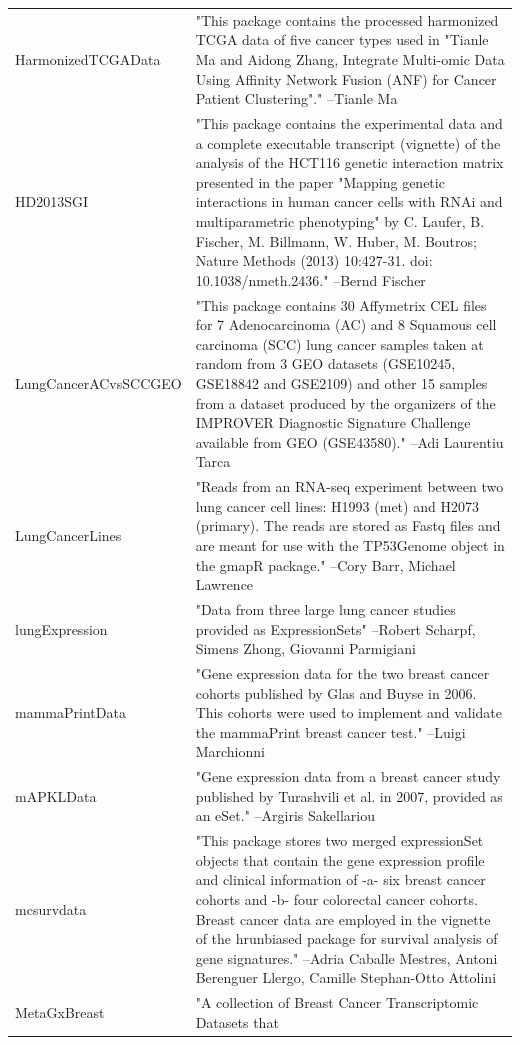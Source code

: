 \documentclass[]{article}
\begin{document}
\begin{longtable}[t]{l>{\raggedright\arraybackslash}p{25em}}
\addlinespace
HarmonizedTCGAData & "This package contains the processed harmonized TCGA data
of five cancer types used in "Tianle Ma and Aidong Zhang,
Integrate Multi-omic Data Using Affinity Network Fusion (ANF)
for Cancer Patient Clustering"." --Tianle Ma\\
HD2013SGI & "This package contains the experimental data and a complete
executable transcript (vignette) of the analysis of the HCT116
genetic interaction matrix presented in the paper "Mapping
genetic interactions in human cancer cells with RNAi and
multiparametric phenotyping" by C. Laufer, B. Fischer, M.
Billmann, W. Huber, M. Boutros; Nature Methods (2013)
10:427-31. doi: 10.1038/nmeth.2436." --Bernd Fischer\\
LungCancerACvsSCCGEO & "This package contains 30 Affymetrix CEL files for 7
Adenocarcinoma (AC) and 8 Squamous cell carcinoma (SCC) lung
cancer samples taken at random from 3 GEO datasets (GSE10245,
GSE18842 and GSE2109) and other 15 samples from a dataset
produced by the organizers of the IMPROVER Diagnostic Signature
Challenge available from GEO (GSE43580)." --Adi Laurentiu Tarca\\
LungCancerLines & "Reads from an RNA-seq experiment between two lung cancer
cell lines: H1993 (met) and H2073 (primary). The reads are
stored as Fastq files and are meant for use with the TP53Genome
object in the gmapR package." --Cory Barr, Michael Lawrence\\
lungExpression & "Data from three large lung cancer studies provided as
ExpressionSets" --Robert Scharpf, Simens Zhong, Giovanni Parmigiani\\
\addlinespace
mammaPrintData & "Gene expression data for the two breast cancer cohorts
published by Glas and Buyse in 2006. This cohorts were used to
implement and validate the mammaPrint breast cancer test." --Luigi Marchionni\\
mAPKLData & "Gene expression data from a breast cancer study published
by Turashvili et al. in 2007, provided as an eSet." --Argiris Sakellariou\\
mcsurvdata & "This package stores two merged expressionSet objects that
contain the gene expression profile and clinical information of
-a- six breast cancer cohorts and -b- four colorectal cancer
cohorts. Breast cancer data are employed in the vignette of the
hrunbiased package for survival analysis of gene signatures." --Adria Caballe Mestres, Antoni Berenguer Llergo, Camille Stephan-Otto Attolini\\
MetaGxBreast & "A collection of Breast Cancer Transcriptomic Datasets that

\end{longtable}
\end{document}
